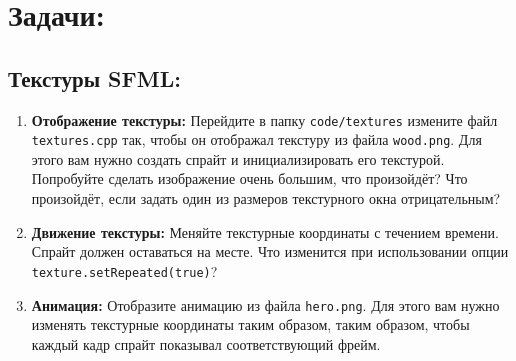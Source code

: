\documentclass{article}
\begin{document}



\section*{Задачи:}

\subsection*{Текстуры SFML:}
\begin{enumerate}
\item \textbf{Отображение текстуры:} Перейдите в папку \texttt{code/textures} измените файл \texttt{textures.cpp} так, чтобы он отображал текстуру из файла \texttt{wood.png}. Для этого вам нужно создать спрайт и инициализировать его текстурой. Попробуйте сделать изображение очень большим, что произойдёт? Что произойдёт, если задать один из размеров текстурного окна отрицательным?
\item \textbf{Движение текстуры:} Меняйте текстурные координаты с течением времени. Спрайт должен оставаться на месте. Что изменится при использовании опции \texttt{texture.setRepeated(true)}?
\item \textbf{Анимация:} Отобразите анимацию из файла \texttt{hero.png}. Для этого вам нужно изменять текстурные координаты таким образом, таким образом, чтобы каждый кадр спрайт показывал соответствующий фрейм.\\
\end{enumerate}
\end{document}
